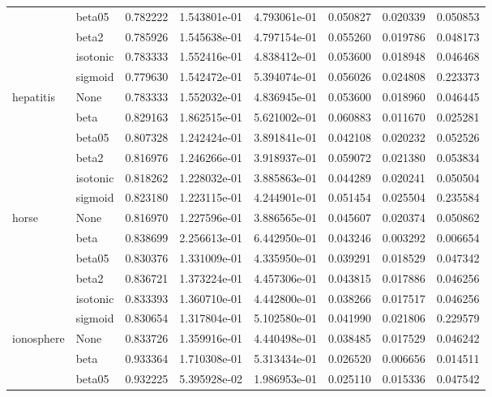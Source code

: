 \begin{tabular}{llrrrrrr}
        & beta05 &  0.782222 &  1.543801e-01 &  4.793061e-01 &  0.050827 &  0.020339 &  0.050853 \\
        & beta2 &  0.785926 &  1.545638e-01 &  4.797154e-01 &  0.055260 &  0.019786 &  0.048173 \\
        & isotonic &  0.783333 &  1.552416e-01 &  4.838412e-01 &  0.053600 &  0.018948 &  0.046468 \\
        & sigmoid &  0.779630 &  1.542472e-01 &  5.394074e-01 &  0.056026 &  0.024808 &  0.223373 \\
hepatitis & None &  0.783333 &  1.552032e-01 &  4.836945e-01 &  0.053600 &  0.018960 &  0.046445 \\
        & beta &  0.829163 &  1.862515e-01 &  5.621002e-01 &  0.060883 &  0.011670 &  0.025281 \\
        & beta05 &  0.807328 &  1.242424e-01 &  3.891841e-01 &  0.042108 &  0.020232 &  0.052526 \\
        & beta2 &  0.816976 &  1.246266e-01 &  3.918937e-01 &  0.059072 &  0.021380 &  0.053834 \\
        & isotonic &  0.818262 &  1.228032e-01 &  3.885863e-01 &  0.044289 &  0.020241 &  0.050504 \\
        & sigmoid &  0.823180 &  1.223115e-01 &  4.244901e-01 &  0.051454 &  0.025504 &  0.235584 \\
horse & None &  0.816970 &  1.227596e-01 &  3.886565e-01 &  0.045607 &  0.020374 &  0.050862 \\
        & beta &  0.838699 &  2.256613e-01 &  6.442950e-01 &  0.043246 &  0.003292 &  0.006654 \\
        & beta05 &  0.830376 &  1.331009e-01 &  4.335950e-01 &  0.039291 &  0.018529 &  0.047342 \\
        & beta2 &  0.836721 &  1.373224e-01 &  4.457306e-01 &  0.043815 &  0.017886 &  0.046256 \\
        & isotonic &  0.833393 &  1.360710e-01 &  4.442800e-01 &  0.038266 &  0.017517 &  0.046256 \\
        & sigmoid &  0.830654 &  1.317804e-01 &  5.102580e-01 &  0.041990 &  0.021806 &  0.229579 \\
ionosphere & None &  0.833726 &  1.359916e-01 &  4.440498e-01 &  0.038485 &  0.017529 &  0.046242 \\
        & beta &  0.933364 &  1.710308e-01 &  5.313434e-01 &  0.026520 &  0.006656 &  0.014511 \\
        & beta05 &  0.932225 &  5.395928e-02 &  1.986953e-01 &  0.025110 &  0.015336 &  0.047542 \\

\end{tabular}
